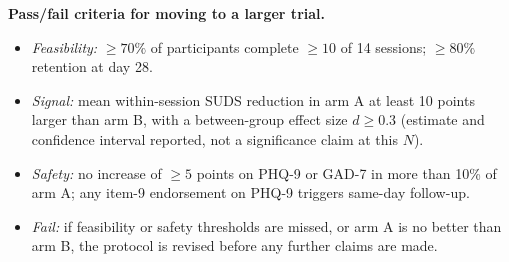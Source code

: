 \documentclass[11pt]{article}
\begin{document}
\textbf{Pass/fail criteria for moving to a larger trial.}
\begin{itemize}[leftmargin=1.2em]
\item \emph{Feasibility:} $\geq 70\%$ of participants complete $\geq 10$ of 14 sessions; $\geq 80\%$ retention at day 28.
\item \emph{Signal:} mean within-session SUDS reduction in arm A at least 10 points larger than arm B, with a between-group effect size $d \geq 0.3$ (estimate and confidence interval reported, not a significance claim at this $N$).
\item \emph{Safety:} no increase of $\geq 5$ points on PHQ-9 or GAD-7 in more than 10\% of arm A; any item-9 endorsement on PHQ-9 triggers same-day follow-up.
\item \emph{Fail:} if feasibility or safety thresholds are missed, or arm A is no better than arm B, the protocol is revised before any further claims are made.
\end{itemize}
\end{document}
